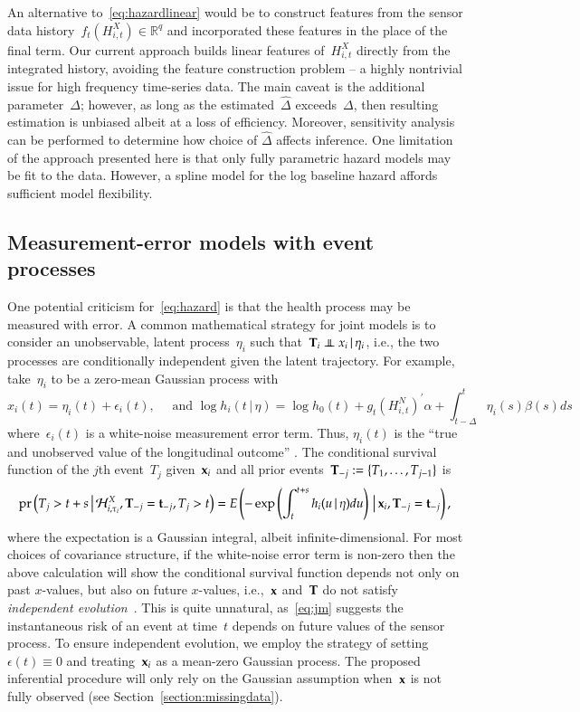 \documentclass[11pt]{amsart}
\def\pr{\mathop{\text{pr}}\nolimits}
\def\pr{\mathop{\text{pr}}\nolimits}
\def\indep{\mathrel{\rlap{$\perp$}\kern1.6pt\mathord{\perp}}}
\def\H{\mathcal{H}}
\def\given{\, | \,}
\def\Given{\, \big | \,}
\def\bft{{\bf t}}
\def\bfx{{\bf x}}
\def\bfT{{\bf T}}
\begin{document}
An alternative to~\eqref{eq:hazardlinear} would be to construct features from the sensor data history~$f_t ( H_{i,t}^{X}) \in \mathbb{R}^q$ and incorporated these features in the place of the final term. Our current approach builds linear features of~$H_{i,t}^X$ directly from the integrated history, avoiding the feature construction problem -- a highly nontrivial issue for high frequency time-series data.  The main caveat is the additional parameter~$\Delta$; however, as long as the estimated~$\hat \Delta$ exceeds~$\Delta$, then resulting estimation is unbiased albeit at a loss of efficiency.  Moreover, sensitivity analysis can be performed to determine how choice of $\hat \Delta$ affects inference.  One limitation of the approach presented here is that only fully parametric hazard models may be fit to the data. However, a spline model for the log baseline hazard affords sufficient model flexibility.

\subsection{Measurement-error models with event processes}
\label{section:memproblems}

One potential criticism for~\eqref{eq:hazard} is that the health process may be measured with error. A common mathematical strategy for joint models is to consider an unobservable, latent process~$\eta_i$ such that~$\bfT_i \indep x_i \given \eta_i$, i.e., the two processes are conditionally independent given the latent trajectory. For example, take~$\eta_i$ to be a zero-mean Gaussian process with
\begin{equation}\label{eq:jm}
x_i(t) = \eta_i (t) + \epsilon_i (t),\quad \text{ and } \log h_i (t
\given \eta ) = \log h_0 (t) + g_t \left( H_{i,t}^N \right)^{\prime}
\alpha + \int_{t-\Delta}^t \eta_i (s) \beta (s) ds
\end{equation}
where~$\epsilon_i(t)$ is a white-noise measurement error term. Thus, $\eta_i (t)$ is the ``true and unobserved value of the longitudinal outcome'' \citep[Sec. 2.1, pp.3]{Rizopoulos2010}. The conditional survival function of the $j$th event~$T_j$ given~$\bfx_i$ and all prior events~$\bfT_{-j} := \{ T_1, \ldots, T_{j-1} \}$ is
\[
\pr \left ( T_j > t+s \Given \H_{i,\tau_i}^X, \bfT_{-j} = \bft_{-j}, T_j > t \right) = E \left( - \exp \left( \int_{t}^{t+s} h_i (u \given \eta ) du \right) \Given \bfx_i, \bfT_{-j} = \bft_{-j} \right),
\]
where the expectation is a Gaussian integral, albeit infinite-dimensional.  For most choices of covariance structure, if the white-noise error term is non-zero then the above calculation will show the conditional survival function depends not only on past $x$-values, but also on future $x$-values, i.e.,~$\bfx$ and~$\bfT$ do not satisfy \emph{independent evolution}~\citep{DempseyPMCC2}. This is quite unnatural, as~\eqref{eq:jm} suggests the instantaneous risk of an event at time~$t$ depends on future values of the sensor process. To ensure independent evolution, we employ the strategy of setting~$\epsilon (t) \equiv 0$ and treating~$\bfx_i$ as a mean-zero Gaussian process. The proposed inferential procedure will only rely on the Gaussian assumption when~$\bfx$ is not fully observed (see Section~\ref{section:missingdata}).
\end{document}
